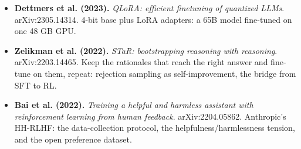 \documentclass[11pt,letterpaper]{article}
\begin{document}
\begin{itemize}[leftmargin=1.2em,itemsep=3pt]
\item \textbf{Dettmers et al. (2023).} \textit{QLoRA: efficient finetuning of quantized LLMs}. arXiv:2305.14314. 4-bit base plus LoRA adapters: a 65B model fine-tuned on one 48 GB GPU.
\item \textbf{Zelikman et al. (2022).} \textit{STaR: bootstrapping reasoning with reasoning}. arXiv:2203.14465. Keep the rationales that reach the right answer and fine-tune on them, repeat: rejection sampling as self-improvement, the bridge from SFT to RL.
\item \textbf{Bai et al. (2022).} \textit{Training a helpful and harmless assistant with reinforcement learning from human feedback}. arXiv:2204.05862. Anthropic's HH-RLHF: the data-collection protocol, the helpfulness/harmlessness tension, and the open preference dataset.
\end{itemize}
\end{document}
